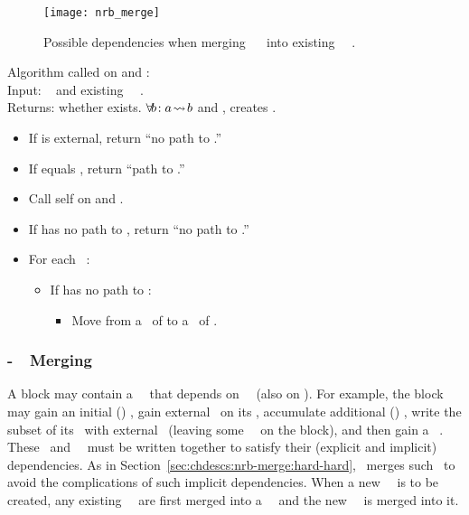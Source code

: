 \begin{figure}[htb]
  \centering
  \texttt{[image: nrb\_merge]}
  \caption{Possible dependencies when merging \nrb\ \chdesc\ 
    into existing \nrb\ \chdesc\ .}
  \label{fig:nrb-merge}
\end{figure}

\noindent Algorithm called on  and :\\
Input: \chdesc\  and existing \nrb\ \chdesc\ .\\
Returns: whether  exists. \(\forall\! b\!: a\! \leadsto\! b\) and , creates .

\begin{itemize}
\item If  is external, return ``no path to .''
\item If  equals , return ``path to .''
\item Call self on  and .
\item If  has no path to , return ``no path to .''
\item For each  \before\ :
  \begin{itemize}
    \item If  has no path to :
      \begin{itemize}
      \item Move  from a \before\ of  to a \before\ of .
      \end{itemize}
  \end{itemize}
\end{itemize}


\subsubsection{\Nrb-\Rb\ \ChDesc\ Merging}
\label{sec:chdescs:nrb-merge:hard-soft}
A block  may contain a \nrb\ \chdesc\ that depends on \rb\ \chdescs\
(also on ).
%
For example, the block may gain an initial (\nrb{}) \chdesc, gain
external \afters\ on its \chdesc, accumulate additional (\rb{})
\chdescs, write the subset of its \chdescs\ with external \afters\
(leaving some \rb\ \chdescs\ on the block), and then gain a \nrb\
\chdesc.
%
These \rb\ and \nrb\ \chdescs\ must be written together to satisfy
their (explicit and implicit) dependencies.
%
As in Section~\ref{sec:chdescs:nrb-merge:hard-hard}, \Kudos\ merges
such \chdescs\ to avoid the complications of such implicit
dependencies.  When a new \nrb\ \chdesc\ is to be created, any
existing \rb\ \chdescs\ are first merged into a \nrb\ \chdesc\
and the new \nrb\ \chdesc\ is merged into it.

